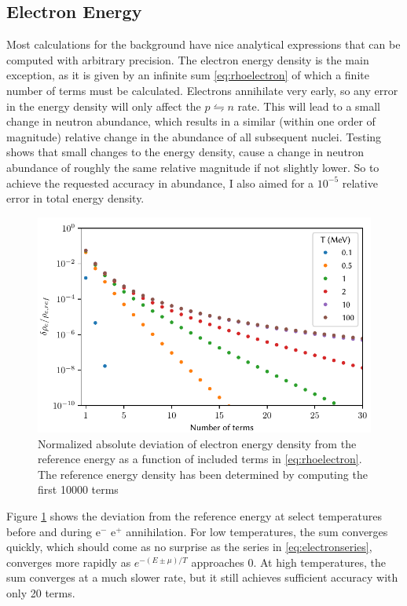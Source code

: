 \subsection{Electron Energy}
Most calculations for the background have nice analytical expressions that can be computed with arbitrary precision. The electron energy density is the main exception, as it is given by an infinite sum \eqref{eq:rhoelectron} of which a finite number of terms must be calculated. Electrons annihilate very early, so any error in the energy density will only affect the $p\leftrightharpoons n$ rate. This will lead to a small change in neutron abundance, which results in a similar (within one order of magnitude) relative change in the abundance of all subsequent nuclei. 
Testing shows that small changes to the energy density, cause a change in neutron abundance of roughly the same relative magnitude if not slightly lower. So to achieve the requested accuracy in abundance, I also aimed for a $10^{-5}$ relative error in total energy density. 
\begin{figure}[ht!]
    \includegraphics[width=5.1in]{figures/Besselaccuracy.pdf}
    \caption{Normalized absolute deviation of electron energy density from the reference energy as a function of included terms in \eqref{eq:rhoelectron}. The reference energy density has been determined by computing the first 10000 terms}
    \label{fig:Besselaccuracy}
\end{figure}

Figure \ref{fig:Besselaccuracy} shows the deviation from the reference energy at select temperatures before and during e$^-$ e$^+$ annihilation. For low temperatures, the sum converges quickly, which should come as no surprise as the series in \eqref{eq:electronseries}, converges more rapidly as $e^{-(E\pm\mu)/T}$ approaches 0. At high temperatures, the sum converges at a much slower rate, but it still achieves sufficient accuracy with only 20 terms.


